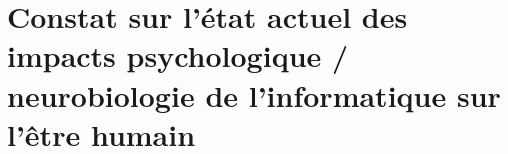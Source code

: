 
\chapter{Constat sur l'état actuel des impacts psychologique / neurobiologie de l'informatique sur l'être humain}\label{neurobio}


